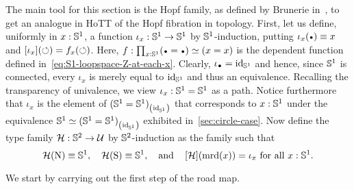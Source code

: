 \documentclass[english,a4paper]{lmcs}
\begin{document}
The main tool for this section is the Hopf family, as defined by Brunerie
in~\cite{brunerie:thesis}, to get an analogue in HoTT of the Hopf
fibration in topology. First, let us define, uniformly in $x:{{\mathbb S^{1}}}$, a
function $\iota_x: {{\mathbb S^{1}}}\to{{\mathbb S^{1}}}$ by ${{\mathbb S^{1}}}$-induction, putting
$\iota_x(\base) \jdeq x$ and $\mathop{\left[{\iota_x}\right]}(\mathord{\circlearrowleft}) = f_x(\mathord{\circlearrowleft})$.
Here, $f\from \prod_{x\from\Sc} (\base=\base) \weq (x=x)$ is the
dependent function defined in~\cref{eq:S1-loopspace-Z-at-each-x}.
Clearly, $\iota_{\base}=\id_{\Sc}$ and hence, since ${{\mathbb S^{1}}}$ is connected,
every $\iota_x$ is merely equal to $\mathord{\mathrm{id}}_{{{\mathbb S^{1}}}}$ and thus an equivalence.
Recalling the transparency of univalence,
we view $\iota_x: {{\mathbb S^{1}}}={{\mathbb S^{1}}}$ as a path.
Notice furthermore that $\iota_x$ is the element
of ${({{\mathbb S^{1}}}={{\mathbb S^{1}}})}_{\left(\mathord{\mathrm{id}}_{{\mathbb S^{1}}}\right)}$ that corresponds to $x:{{\mathbb S^{1}}}$
under the equivalence ${{\mathbb S^{1}}} \simeq {({{\mathbb S^{1}}}={{\mathbb S^{1}}})}_{\left(\mathord{\mathrm{id}}_{{\mathbb S^{1}}}\right)}$
exhibited in~\cref{sec:circle-case}. Now define the type family
${\mathcal H}: {{\mathbb S^{2}}} \to \mathcal{U}$ by ${{\mathbb S^{2}}}$-induction as the family such that
\begin{displaymath}
  {\mathcal H}(\mathrm{N}) \equiv {{\mathbb S^{1}}},\quad
  {\mathcal H}(\mathrm{S}) \equiv {{\mathbb S^{1}}},\quad\text{and}\quad
  \mathop{\left[{{\mathcal H}}\right]} (\operatorname{\mathrm{mrd}}(x)) = \iota_x\ \text{for all}\ x:{{\mathbb S^{1}}}.
\end{displaymath}

We start by carrying out the first step of the road map.
\end{document}

